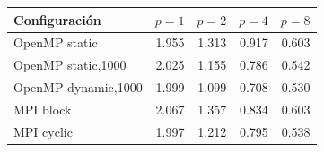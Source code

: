 \begin{tabular}{lrrrr}
\toprule
Configuraci\'on & $p=1$ & $p=2$ & $p=4$ & $p=8$ \\
\midrule
OpenMP static & 1.955 & 1.313 & 0.917 & 0.603 \\
OpenMP static,1000 & 2.025 & 1.155 & 0.786 & 0.542 \\
OpenMP dynamic,1000 & 1.999 & 1.099 & 0.708 & 0.530 \\
MPI block & 2.067 & 1.357 & 0.834 & 0.603 \\
MPI cyclic & 1.997 & 1.212 & 0.795 & 0.538 \\
\bottomrule
\end{tabular}